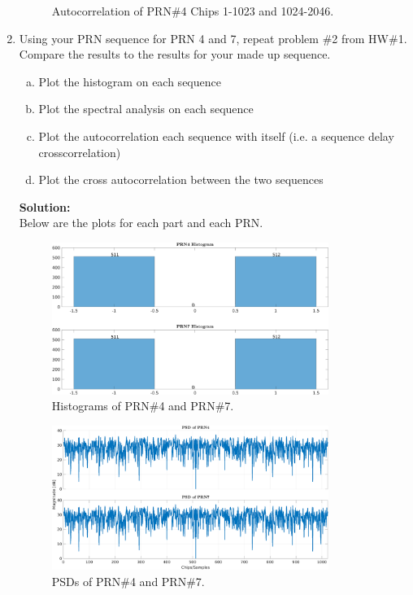 \documentclass[11pt]{article}
\newcommand{\solution}{\textbf{Solution: \\}}
\begin{document}
\begin{enumerate}[label=\textbf{\arabic*.}]
\begin{figure}[H]
    \caption{Autocorrelation of PRN\#4 Chips 1-1023 and 1024-2046.}
  \end{figure}
  
  \vspace{24pt}
  \item Using your PRN sequence for PRN 4 and 7, repeat problem \#2 from 
  HW\#1. Compare the results to the results for your made up sequence.
  \begin{enumerate}[(a)]
    \item Plot the histogram on each sequence
    \item Plot the spectral analysis on each sequence
    \item Plot the autocorrelation each sequence with itself (i.e. a sequence 
    delay crosscorrelation)
    \item Plot the cross autocorrelation between the two sequences
  \end{enumerate}
  \solution
  Below are the plots for each part and each PRN.
  \begin{figure}[H]
    \centering
    \includegraphics[width=0.85\textwidth]{7a.png}
    \caption{Histograms of PRN\#4 and PRN\#7.}
  \end{figure}
  \begin{figure}[H]
    \centering
    \includegraphics[width=0.85\textwidth]{7b.png}
    \caption{PSDs of PRN\#4 and PRN\#7.}

\end{figure}
\end{enumerate}
\end{document}

